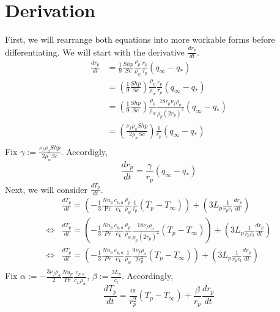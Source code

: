 \documentclass{article}
\begin{document}
\section{Derivation}

First, we will rearrange both equations into more workable forms before differentiating. We will start with the derivative $\frac{dr_p}{dt}$.
\begin{align*}
    \frac{dr_{p}}{dt} &= \frac{1}{9}\frac{Shp}{Sc}\frac{\rho_{p}}{\rho_{w}}
                         \frac{r_{p}}{\tau_{p}}(q_{\infty} - q_*)\\
    &= \left(\frac{1}{9}\frac{Shp}{Sc}\right) \frac{\rho_{p}}{\rho_{w}}
                        \frac{r_{p}}{\tau_{p}}(q_{\infty} - q_*)\\
    &= \left(\frac{1}{9}\frac{Shp}{Sc}\right)\frac{\rho_{p}}{\rho_{w}}
                        \frac{18r_{p}\nu_{f}\rho_{a}}{\rho_{p}(2r_{p})^2}(q_{\infty}-q_*)\\
    &= \left(\frac{\nu_{f}\rho_{a}Shp}{2\rho_{w}Sc}\right)\frac{1}{r_{p}}(q_{\infty} - q_*)\\
\end{align*}
Fix $\gamma := \frac{\nu_{f}\rho_{a}Shp}{2\rho_{w}Sc}$. Accordigly,
\[
	\frac{dr_{p}}{dt} = \frac{\gamma}{r_{p}}(q_{\infty} - q_*)
\]
Next, we will consider $\frac{dT_{p}}{dt}$.
\begin{align*}
    &\frac{dT_{p}}{dt} = \left(-\frac{1}{3}\frac{Nu_{p}}{\Pr}\frac{c_{p,a}}{c_L}
                               \frac{\rho_{p}}{\rho_{w}}\frac{1}{\tau_{p}}(T_{p}-T_{\infty})\right)
		       + \left(3L_{p}\frac{1}{r_{p}c_{l}}\frac{dr_{p}}{dt}\right)\\
    \iff&\frac{dT_{p}}{dt} = \left(-\frac{1}{3}\frac{Nu_{p}}{Pr}\frac{c_{p,a}}{c_L}
                               \frac{\rho_{p}}{\rho_{w}}\frac{18\nu_{f}\rho_{a}}{\rho_{p}(2r_{p})^2}(T_{p}-T_{\infty})\right)
		       + \left(3L_{p}\frac{1}{r_{p}c_{l}}\frac{dr_{p}}{dt}\right)\\
    \iff&\frac{dT_{p}}{dt} = \left(-\frac{1}{3}\frac{Nu_{p}}{Pr}\frac{c_{p,a}}{c_L}
                               \frac{1}{\rho_{w}}\frac{9\nu_{f}\rho_{a}}{2r_{p}^2}(T_{p}-T_{\infty})\right)
		       + \left(3L_{p}\frac{1}{r_{p}c_{l}}\frac{dr_{p}}{dt}\right)\\
\end{align*}
Fix $\alpha := -\frac{3\nu_{f}\rho_{a}}{2}\frac{Nu_{p}}{Pr}\frac{c_{p,a}}{c_L\rho_{w}}$,
    $\beta  := \frac{3L_{p}}{c_{l}}$. Accordingly,
\[
    \frac{dT_{p}}{dt} = \frac{\alpha}{r_{p}^2}(T_{p}-T_{\infty})
                      + \frac{\beta}{r_{p}}\frac{dr_{p}}{dt}
\]
\end{document}
